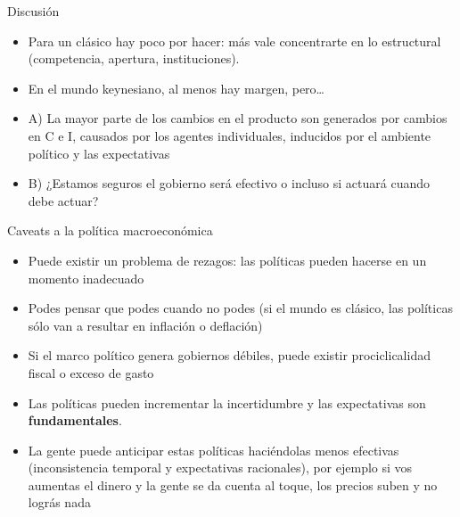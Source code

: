\documentclass{beamer}
\begin{document}
\begin{frame}{Discusión}

    \begin{itemize}
    \item Para un clásico hay poco por hacer: más vale concentrarte en lo estructural (competencia, apertura, instituciones).
    \item En el mundo keynesiano, al menos hay margen, pero…
    \item A) La mayor parte de los cambios en el producto son generados por cambios en C e I, causados por los agentes individuales, inducidos por el ambiente político y las expectativas
    \item B) ¿Estamos seguros el gobierno será efectivo o incluso si actuará cuando debe actuar? 
    \end{itemize}

\end{frame}

\begin{frame}{Caveats a la política macroeconómica}
    \begin{itemize}
    \item Puede existir un problema de rezagos: las políticas pueden hacerse en un momento inadecuado
    \item Podes pensar que podes cuando no podes (si el mundo es clásico, las políticas sólo van a resultar en inflación o deflación)
    \item Si el marco político genera gobiernos débiles, puede existir prociclicalidad fiscal o exceso de gasto
    \item Las políticas pueden incrementar la incertidumbre y las expectativas son \textbf{fundamentales}.
    \item La gente puede anticipar estas políticas haciéndolas menos efectivas (inconsistencia temporal y expectativas racionales), por ejemplo si vos aumentas el dinero y la gente se da cuenta al toque, los precios suben y no lográs nada
    \end{itemize}
\end{frame}


\end{document}
